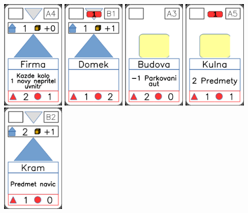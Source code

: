\documentclass[a4paper]{article}
\begin{document}
	\includegraphics[width=3.0cm]{img-3_18}
	\includegraphics[width=3.0cm]{img-3_5}
	\includegraphics[width=3.0cm]{img-2_2}
	\includegraphics[width=3.0cm]{img-2_19}
	\includegraphics[width=3.0cm]{img-3_6}
\end{document}
